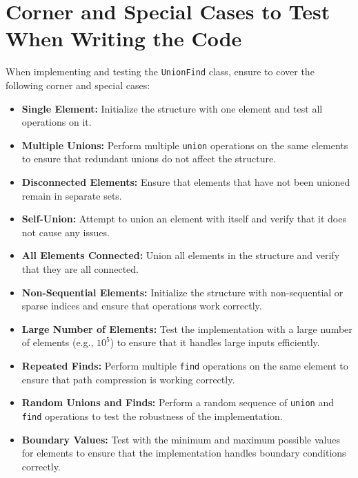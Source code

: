 \section*{Corner and Special Cases to Test When Writing the Code}

When implementing and testing the \texttt{UnionFind} class, ensure to cover the following corner and special cases:

\begin{itemize}
    \item \textbf{Single Element:}  
    Initialize the structure with one element and test all operations on it.
    
    \item \textbf{Multiple Unions:}  
    Perform multiple \texttt{union} operations on the same elements to ensure that redundant unions do not affect the structure.
    
    \item \textbf{Disconnected Elements:}  
    Ensure that elements that have not been unioned remain in separate sets.
    
    \item \textbf{Self-Union:}  
    Attempt to union an element with itself and verify that it does not cause any issues.
    
    \item \textbf{All Elements Connected:}  
    Union all elements in the structure and verify that they are all connected.
    
    \item \textbf{Non-Sequential Elements:}  
    Initialize the structure with non-sequential or sparse indices and ensure that operations work correctly.
    
    \item \textbf{Large Number of Elements:}  
    Test the implementation with a large number of elements (e.g., \(10^5\)) to ensure that it handles large inputs efficiently.
    
    \item \textbf{Repeated Finds:}  
    Perform multiple \texttt{find} operations on the same element to ensure that path compression is working correctly.
    
    \item \textbf{Random Unions and Finds:}  
    Perform a random sequence of \texttt{union} and \texttt{find} operations to test the robustness of the implementation.
    
    \item \textbf{Boundary Values:}  
    Test with the minimum and maximum possible values for elements to ensure that the implementation handles boundary conditions correctly.
\end{itemize}

